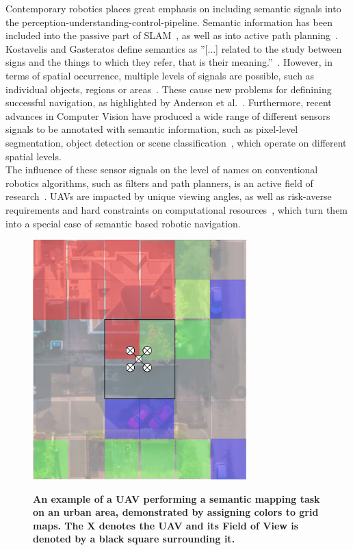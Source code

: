 \documentclass[twocolumn,letterpaper]{IEEEAerospaceCLS}  %
\begin{document}
Contemporary robotics places great emphasis on including semantic signals into the perception-understanding-control-pipeline. Semantic information has been included into the passive part of SLAM~\cite{cadena_past_2016,zhang_hierarchical_2019}, as well as into active path planning~\cite{koch_automatic_2019,alirezaie_exploiting_2017}. Kostavelis and Gasteratos define semantics as ''[...] related to the study between signs and the things to which they refer, that is their meaning.''~\cite{kostavelis_semantic_2015}. However, in terms of spatial occurrence, multiple levels of signals are possible, such as individual objects, regions or areas~\cite{kostavelis_semantic_2015}. These cause new problems for definining successful navigation, as highlighted by Anderson et al.~\cite{anderson_evaluation_2018}. Furthermore, recent advances in Computer Vision have produced a wide range of different sensors signals to be annotated with semantic information, such as pixel-level segmentation, object detection or scene classification~\cite{alom_history_2018}, which operate on different spatial levels.\\
The influence of these sensor signals on the level of names on conventional robotics algorithms, such as filters and path planners, is an active field of research~\cite{kostavelis_semantic_2015,cadena_past_2016,anderson_evaluation_2018}. UAVs are impacted by unique viewing angles, as well as risk-averse requirements and hard constraints on computational resources~\cite{mandel_method_2020,gonzalez_unmanned_2016}, which turn them into a special case of semantic based robotic navigation.
\begin{figure}
    \centering
    \includegraphics[width=3.25in]{Aerial13.png}\\
    \caption{\bf{An example of a UAV performing a semantic mapping task on an urban area, demonstrated by assigning colors to grid maps. The X denotes the UAV and its Field of View is denoted by a black square surrounding it.}}
    \label{fig:AerialImg}
\end{figure}
\end{document}
